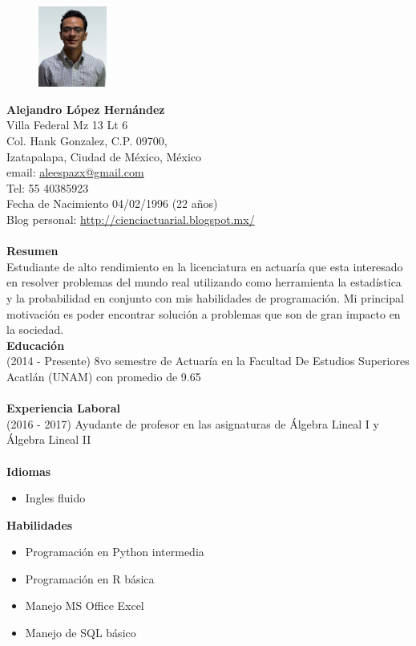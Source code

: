 \documentclass[11pt,letter]{article}
\begin{document}
\pagestyle{empty}
\noindent
\begin{figure}
    \centering
    \includegraphics[width=0.2\textwidth]{CV}
\end{figure} 
\Large{\textbf{Alejandro López Hernández}}  
\\
\normalsize
Villa Federal Mz 13 Lt 6\\ Col. Hank Gonzalez, C.P. 09700, \\Izatapalapa, Ciudad de México, México\\ email: \href{mailto:aleespazx@gmail.com}{aleespazx@gmail.com}\\Tel: 55 40385923 \\ Fecha de Nacimiento 04/02/1996 (22 años)\\ Blog personal: \url{http://cienciactuarial.blogspot.mx/}\\\\
\noindent
\textbf{Resumen}\\
Estudiante de alto rendimiento en la licenciatura en actuaría que esta interesado en resolver problemas del mundo real utilizando como herramienta la estadística y la probabilidad en conjunto con mis habilidades de programación. Mi principal motivación es poder encontrar solución a problemas que son de gran impacto en la sociedad. \\
\textbf{Educación}\\
(2014 - Presente) 8vo semestre de Actuaría en la Facultad De Estudios Superiores Acatlán (UNAM) con promedio de 9.65\\\\
\textbf{Experiencia Laboral}\\
(2016 - 2017) \quad Ayudante de profesor en las asignaturas de Álgebra Lineal I y Álgebra Lineal II\\\\
\textbf{Idiomas}
\begin{itemize}
\item Ingles fluido
\end{itemize}
\textbf{Habilidades}
\begin{itemize}
\item Programación en Python intermedia
\item Programación en R básica
\item Manejo MS Office Excel
\item Manejo de SQL básico
\end{itemize}
\end{document}
